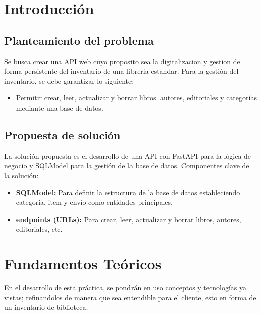 \documentclass[12pt]{article}
\begin{document}
\newpage
\tableofcontents
\newpage

\section{Introducción}
\subsection*{Planteamiento del problema}
Se busca crear una API web cuyo proposito sea la digitalizacion y gestion de forma persistente del inventario
de una libreria estandar.
Para la gestión del inventario, se debe garantizar lo siguiente:
\begin{itemize}
    \item Permitir crear, leer, actualizar y borrar libros. autores, editoriales y categorías mediante una base de datos.
\end{itemize}


\subsection*{Propuesta de solución}
La solución propuesta es el desarrollo de una API con FastAPI para la lógica de negocio y SQLModel para la gestión de la base de datos.
Componentes clave de la solución:
\begin{itemize}
    \item \textbf{SQLModel:} Para definir la estructura de la base de datos estableciendo categoría, item y envío como entidades principales.
    \item \textbf{endpoints (URLs):} Para crear, leer, actualizar y borrar libros, autores, editoriales, etc.
\end{itemize}

\newpage
\section{Fundamentos Teóricos}
En el desarrollo de esta práctica, se pondrán en uso conceptos y tecnologías ya vistas; refinandolos de manera que sea entendible para el cliente, esto en forma de un inventario de biblioteca.
\end{document}
